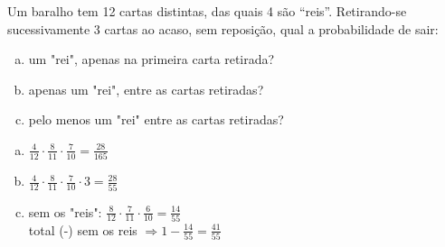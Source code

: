 \begin{ex}
 Um baralho tem 12 cartas distintas, das quais 4 são “reis”. Retirando-se sucessivamente 3 cartas ao acaso, sem reposição, qual a probabilidade de sair:
    \begin{enumerate}[(a)]
    \item um "rei", apenas na primeira carta retirada?
    \item apenas um "rei", entre as cartas retiradas?
    \item pelo menos um "rei" entre as cartas retiradas?
    \end{enumerate}
      \begin{sol}
       \phantom{A}
       \begin{enumerate} [(a)]
           \item $\frac{4}{12}\cdot\frac{8}{11}\cdot\frac{7}{10}=\frac{28}{165}$
           \item $\frac{4}{12}\cdot\frac{8}{11}\cdot\frac{7}{10}\cdot3=\frac{28}{55}$
           \item sem os "reis":  $\frac{8}{12}\cdot\frac{7}{11}\cdot\frac{6}{10}= \frac{14}{55}$ \\
           total  (-)  sem os reis $\Longrightarrow 1-\frac{14}{55}= \frac{41}{55}$
           
       \end{enumerate}
      \end{sol}
\end{ex}